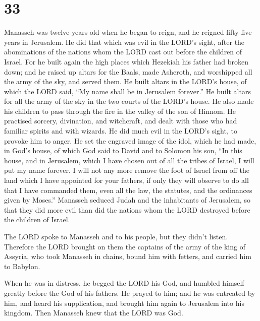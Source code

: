 \hypertarget{section-32}{%
\section{33}\label{section-32}}

 Manasseh was twelve years old when he began to reign, and
he reigned fifty-five years in Jerusalem.  He did that
which was evil in the LORD's sight, after the abominations of the
nations whom the LORD cast out before the children of Israel.
 For he built again the high places which Hezekiah his
father had broken down; and he raised up altars for the Baals, made
Asheroth, and worshipped all the army of the sky, and served them.
 He built altars in the LORD's house, of which the LORD
said, ``My name shall be in Jerusalem forever.''  He built
altars for all the army of the sky in the two courts of the LORD's
house.  He also made his children to pass through the fire
in the valley of the son of Hinnom. He practised sorcery, divination,
and witchcraft, and dealt with those who had familiar spirits and with
wizards. He did much evil in the LORD's sight, to provoke him to anger.
 He set the engraved image of the idol, which he had made,
in God's house, of which God said to David and to Solomon his son, ``In
this house, and in Jerusalem, which I have chosen out of all the tribes
of Israel, I will put my name forever.  I will not any
more remove the foot of Israel from off the land which I have appointed
for your fathers, if only they will observe to do all that I have
commanded them, even all the law, the statutes, and the ordinances given
by Moses.''  Manasseh seduced Judah and the inhabitants of
Jerusalem, so that they did more evil than did the nations whom the LORD
destroyed before the children of Israel.

 The LORD spoke to Manasseh and to his people, but they
didn't listen.  Therefore the LORD brought on them the
captains of the army of the king of Assyria, who took Manasseh in
chains, bound him with fetters, and carried him to Babylon.

 When he was in distress, he begged the LORD his God, and
humbled himself greatly before the God of his fathers. 
He prayed to him; and he was entreated by him, and heard his
supplication, and brought him again to Jerusalem into his kingdom. Then
Manasseh knew that the LORD was God.

